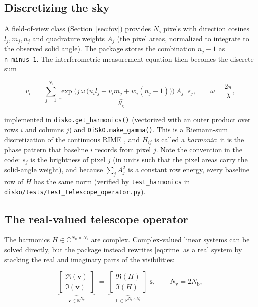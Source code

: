 \documentclass[11pt,a4paper]{article}
\newcommand{\C}{\mathbb{C}}
\newcommand{\R}{\mathbb{R}}
\newcommand{\Ns}{N_{\mathrm{s}}}
\newcommand{\Nv}{N_{\mathrm{v}}}
\newcommand{\Nb}{N_{\mathrm{b}}}
\newcommand{\Gammam}{\boldsymbol{\Gamma}}
\newcommand{\svec}{\boldsymbol{s}}
\newcommand{\vvec}{\boldsymbol{v}}
\begin{document}
\subsection{Discretizing the sky}

A field-of-view class (Section~\ref{sec:fov}) provides $\Ns$ pixels with
direction cosines $l_j,m_j,n_j$ and quadrature weights $A_j$ (the pixel areas,
normalized to integrate to the observed solid angle). The package stores the
combination $n_j-1$ as \texttt{n\_minus\_1}. The interferometric measurement
equation then becomes the discrete sum

\begin{equation}
  \label{eq:rime}
  v_i \;=\; \sum_{j=1}^{\Ns}\;
  \underbrace{\exp\!\Big(j\,\omega\,
    \big(u_i l_j+v_i m_j+w_i(n_j-1)\big)\Big)\,A_j}_{H_{ij}}\;\;s_j,
  \qquad \omega=\frac{2\pi}{\lambda},
\end{equation}

implemented in \texttt{disko.get\_harmonics()} (vectorized with an outer
product over rows $i$ and columns $j$) and
\texttt{DiSkO.make\_gamma()}. This is a Riemann-sum discretization of the
continuous RIME \cite{hamaker1996}, and $H_{ij}$ is called a
\emph{harmonic}: it is the phase pattern that baseline $i$ records from pixel
$j$. Note the convention in the code: $s_j$ is the brightness of pixel $j$
(in units such that the pixel areas carry the solid-angle weight), and because
$\sum_j A_j^2$ is a constant row energy, every baseline row of $H$ has the same
norm (verified by \texttt{test\_harmonics} in
\texttt{disko/tests/test\_telescope\_operator.py}).

\subsection{The real-valued telescope operator}

The harmonics $H\in\C^{\Nb\times\Ns}$ are complex. Complex-valued linear
systems can be solved directly, but the package instead rewrites
\eqref{eq:rime} as a real system by stacking the real and imaginary parts of
the visibilities:

\begin{equation}
  \label{eq:real}
  \underbrace{\begin{bmatrix}\Re(\vvec)\\ \Im(\vvec)\end{bmatrix}}_{\vvec\in\R^{\Nv}}
  \;=\;
  \underbrace{\begin{bmatrix}\Re(H)\\ \Im(H)\end{bmatrix}}_{\Gammam\in\R^{\Nv\times\Ns}}
  \;\svec,
  \qquad \Nv=2\Nb,
\end{equation}
\end{document}

